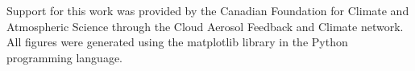 \documentclass[draft,grl]{agutex}
\begin{document}
\begin{article}
\begin{acknowledgments}
Support for this work was provided by the Canadian Foundation for Climate and 
Atmospheric Science through the Cloud Aerosol Feedback and Climate network.
All figures were generated using the matplotlib library in the Python
programming language.
\end{acknowledgments}

%
%
%
%
%
%
%
%
%
%













%
%

\end{article}
\end{document}
